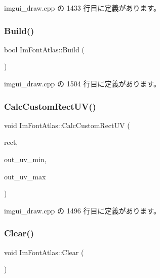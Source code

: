  imgui\+\_\+draw.\+cpp の 1433 行目に定義があります。

\mbox{\label{struct_im_font_atlas_a81e39e30dffa4dd7e458a53297451e27}} 
\subsubsection{\texorpdfstring{Build()}{Build()}}
{\footnotesize\ttfamily bool Im\+Font\+Atlas\+::\+Build (\begin{DoxyParamCaption}{ }\end{DoxyParamCaption})}



 imgui\+\_\+draw.\+cpp の 1504 行目に定義があります。

\mbox{\label{struct_im_font_atlas_a70e062104b11a213eb3d177151c418e2}} 
\subsubsection{\texorpdfstring{Calc\+Custom\+Rect\+U\+V()}{CalcCustomRectUV()}}
{\footnotesize\ttfamily void Im\+Font\+Atlas\+::\+Calc\+Custom\+Rect\+UV (\begin{DoxyParamCaption}\item[{const \mbox{\hyperlink{struct_im_font_atlas_1_1_custom_rect}{Custom\+Rect}} $\ast$}]{rect,  }\item[{\mbox{\hyperlink{struct_im_vec2}{Im\+Vec2}} $\ast$}]{out\+\_\+uv\+\_\+min,  }\item[{\mbox{\hyperlink{struct_im_vec2}{Im\+Vec2}} $\ast$}]{out\+\_\+uv\+\_\+max }\end{DoxyParamCaption})}



 imgui\+\_\+draw.\+cpp の 1496 行目に定義があります。

\mbox{\label{struct_im_font_atlas_a8f6d01c671d8670f991ba651bbaf7e77}} 
\subsubsection{\texorpdfstring{Clear()}{Clear()}}
{\footnotesize\ttfamily void Im\+Font\+Atlas\+::\+Clear (\begin{DoxyParamCaption}{ }\end{DoxyParamCaption})}



